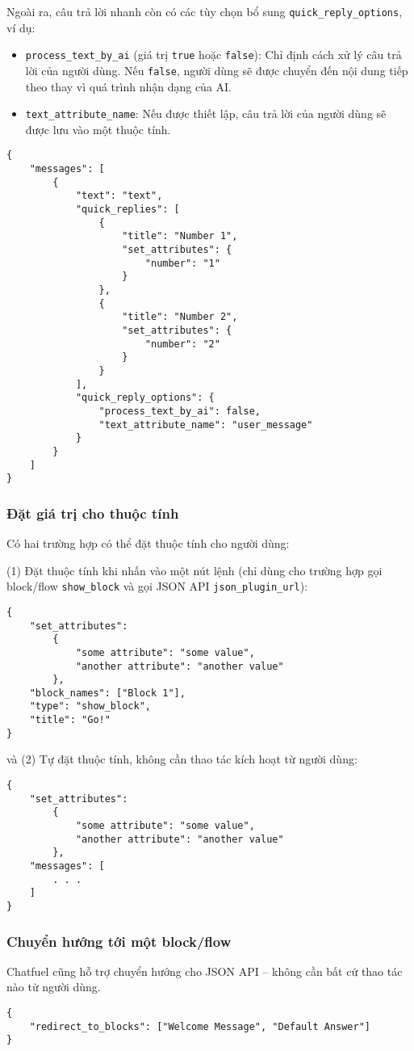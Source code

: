 Ngoài ra, câu trả lời nhanh còn có các tùy chọn bổ sung \texttt{quick\_reply\_options}, ví dụ: \begin{itemize}
\item \texttt{process\_text\_by\_ai} (giá trị \texttt{true} hoặc \texttt{false}): Chỉ định cách xử lý câu trả lời của người dùng. Nếu \texttt{false}, người dùng sẽ được chuyển đến nội dung tiếp theo thay vì quá trình nhận dạng của AI.
\item \texttt{text\_attribute\_name}: Nếu được thiết lập, câu trả lời của người dùng sẽ được lưu vào một thuộc tính.
\end{itemize}\par
\begin{lstlisting}
{
	"messages": [
		{
			"text": "text",
			"quick_replies": [
				{
					"title": "Number 1",
					"set_attributes": {
						"number": "1"
					}
				},
				{
					"title": "Number 2",
					"set_attributes": {
						"number": "2"
					}
				}
			],
			"quick_reply_options": {
				"process_text_by_ai": false,
				"text_attribute_name": "user_message"
			}
		}
	]
}
\end{lstlisting}

\subsubsection{Đặt giá trị cho thuộc tính}
Có hai trường hợp có thể đặt thuộc tính cho người dùng:\par
(1) Đặt thuộc tính khi nhấn vào một nút lệnh (chỉ dùng cho trường hợp gọi block/flow \texttt{show\_block} và gọi JSON API \texttt{json\_plugin\_url}): \begin{lstlisting}
{
	"set_attributes": 
		{
			"some attribute": "some value",
			"another attribute": "another value"
		},
	"block_names": ["Block 1"],
	"type": "show_block",
	"title": "Go!"
}
\end{lstlisting}
và (2) Tự đặt thuộc tính, không cần thao tác kích hoạt từ người dùng:\begin{lstlisting}
{
	"set_attributes":
		{
			"some attribute": "some value",
			"another attribute": "another value"
		},
	"messages": [
		. . .
	]
}
\end{lstlisting}\par

\subsubsection{Chuyển hướng tới một block/flow}
Chatfuel cũng hỗ trợ chuyển hướng cho JSON API – không cần bất cứ thao tác nào từ người dùng.
\begin{lstlisting}
{
	"redirect_to_blocks": ["Welcome Message", "Default Answer"]
}
\end{lstlisting}

